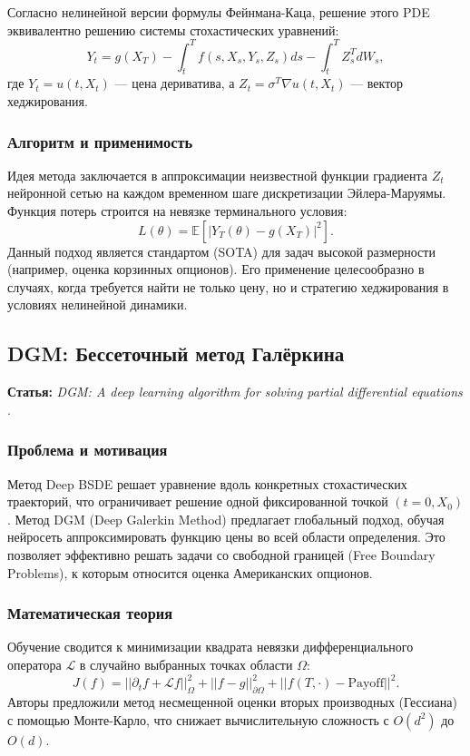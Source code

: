 \documentclass[12pt, a4paper]{article}
\begin{document}
Согласно нелинейной версии формулы Фейнмана-Каца, решение этого PDE эквивалентно решению системы стохастических уравнений:
\begin{equation}
    Y_t = g(X_T) - \int_{t}^{T} f(s, X_s, Y_s, Z_s) ds - \int_{t}^{T} Z_s^T dW_s,
\end{equation}
где $Y_t = u(t, X_t)$ — цена дериватива, а $Z_t = \sigma^T \nabla u(t, X_t)$ — вектор хеджирования.

\subsubsection{Алгоритм и применимость}
Идея метода заключается в аппроксимации неизвестной функции градиента $Z_t$ нейронной сетью на каждом временном шаге дискретизации Эйлера-Маруямы. Функция потерь строится на невязке терминального условия:
\begin{equation}
    L(\theta) = \mathbb{E} \left[ | Y_T(\theta) - g(X_T) |^2 \right].
\end{equation}
Данный подход является стандартом (SOTA) для задач высокой размерности (например, оценка корзинных опционов). Его применение целесообразно в случаях, когда требуется найти не только цену, но и стратегию хеджирования в условиях нелинейной динамики.

\subsection{DGM: Бессеточный метод Галёркина}
\textbf{Статья:} \textit{DGM: A deep learning algorithm for solving partial differential equations} \cite{Sirignano2018}.

\subsubsection{Проблема и мотивация}
Метод Deep BSDE решает уравнение вдоль конкретных стохастических траекторий, что ограничивает решение одной фиксированной точкой $(t=0, X_0)$. Метод DGM (Deep Galerkin Method) предлагает глобальный подход, обучая нейросеть аппроксимировать функцию цены во всей области определения. Это позволяет эффективно решать задачи со свободной границей (Free Boundary Problems), к которым относится оценка Американских опционов.

\subsubsection{Математическая теория}
Обучение сводится к минимизации квадрата невязки дифференциального оператора $\mathcal{L}$ в случайно выбранных точках области $\Omega$:
\begin{equation}
    J(f) = || \partial_t f + \mathcal{L}f ||^2_{\Omega} + ||f - g||^2_{\partial \Omega} + ||f(T, \cdot) - \text{Payoff}||^2.
\end{equation}
Авторы предложили метод несмещенной оценки вторых производных (Гессиана) с помощью Монте-Карло, что снижает вычислительную сложность с $O(d^2)$ до $O(d)$.
\end{document}
